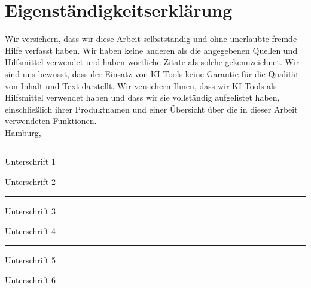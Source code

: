 \section*{Eigenständigkeitserklärung}

Wir versichern, dass wir diese Arbeit selbstständig und ohne unerlaubte fremde Hilfe verfasst haben. Wir haben keine anderen als die angegebenen Quellen und Hilfsmittel verwendet und haben wörtliche Zitate als solche gekennzeichnet. Wir sind uns bewusst, dass der Einsatz von KI-Tools keine Garantie für die Qualität von Inhalt und Text darstellt. Wir versichern Ihnen, dass wir KI-Tools als Hilfsmittel verwendet haben und dass wir sie vollständig aufgelistet haben, einschließlich ihrer Produktnamen und einer Übersicht über die in dieser Arbeit verwendeten Funktionen.\\

Hamburg, \Abgabe\\

\vspace{2cm}

\hrule
\vspace{3mm}

\begin{minipage}[H]{0.49\textwidth}
	Unterschrift 1
\end{minipage}
\begin{minipage}[H]{0.49\textwidth}
	Unterschrift 2
\end{minipage}

\vspace{2cm}

\hrule
\vspace{3mm}

\begin{minipage}[H]{0.49\textwidth}
	Unterschrift 3
\end{minipage}
\begin{minipage}[H]{0.49\textwidth}
	Unterschrift 4
\end{minipage}

\vspace{2cm}

\hrule
\vspace{3mm}

\begin{minipage}[H]{0.49\textwidth}
	Unterschrift 5
\end{minipage}
\begin{minipage}[H]{0.49\textwidth}
	Unterschrift 6
\end{minipage}